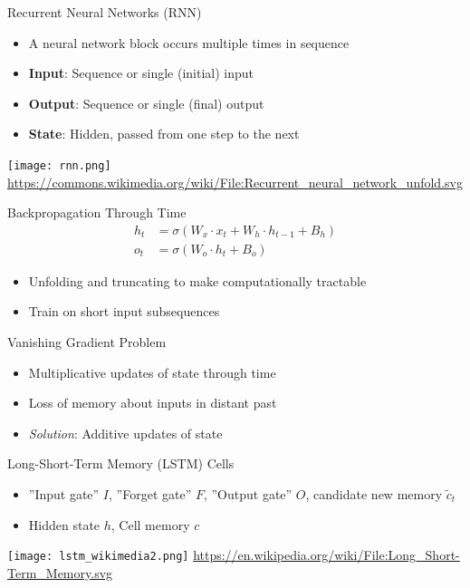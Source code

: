 \documentclass[ignorenonframetext,xcolor=x11names]{beamer}
\begin{document}
\begin{frame}{Recurrent Neural Networks (RNN)}
\begin{itemize}
   \item A neural network block occurs multiple times in sequence
   \item \textbf{Input}: Sequence or single (initial) input
   \item \textbf{Output}: Sequence or single (final) output
   \item \textbf{State}: Hidden, passed from one step to the next
\end{itemize}
\centering
\texttt{[image: rnn.png]}
\scriptsize \url{https://commons.wikimedia.org/wiki/File:Recurrent_neural_network_unfold.svg}
\end{frame}

\begin{frame}{Backpropagation Through Time}
\begin{align*}
h_t &= \sigma ( W_{x} \cdot x_t + W_{h} \cdot h_{t-1} + B_{h}) \\
o_t &= \sigma (W_{o} \cdot h_t + B_{o} ) 
\end{align*}

\begin{itemize}
   \item Unfolding and truncating to make computationally tractable
   \item Train on short input subsequences
\end{itemize}

\begin{block}{Vanishing Gradient Problem}
\begin{itemize}
   \item Multiplicative updates of state through time
   \item Loss of memory about inputs in distant past
   \item \emph{Solution}: Additive updates of state
\end{itemize}
\end{block}
\end{frame}

\begin{frame}{Long-Short-Term Memory (LSTM) Cells}
\begin{itemize}
   \item ''Input gate'' $I$, ''Forget gate'' $F$, ''Output gate'' $O$, candidate new memory $\tilde{c}_t$
   \item Hidden state $h$, Cell memory $c$
\end{itemize}

\begin{center}
\texttt{[image: lstm\_wikimedia2.png]}
\scriptsize \url{https://en.wikipedia.org/wiki/File:Long_Short-Term_Memory.svg} \normalsize
\end{center}
\end{frame}
\end{document}
